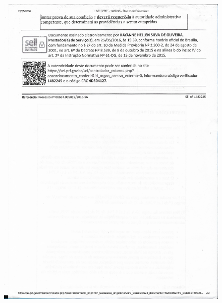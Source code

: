 \begin{figure}[ht!]
		\includegraphics[scale=0.30]{Figuras/Anexos/A1-PRFDadospg_005.pdf}
		\label{fig:Documento liberação dos dados PRF}
\end{figure}

\pagebreak


